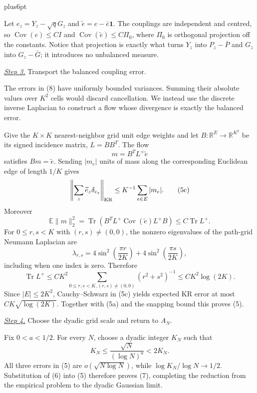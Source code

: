 \documentclass[11pt,reqno]{amsart}
\makeatletter
\theoremstyle{plain}
\theoremstyle{definition}
\theoremstyle{remark}
\renewenvironment{proof}[1][\proofname]{%
  \par
  \pushQED{\qed}%
  \normalfont
  \topsep6pt plus6pt\relax
  \trivlist
  \item[\hskip\labelsep\slshape #1\@addpunct{.}]%
  \ignorespaces
}{%
  \popQED
  \endtrivlist
  \@endpefalse
}
\DeclareRobustCommand{\qed}{%
  \leavevmode\unskip\penalty9999\hbox{}\nobreak
  \ifmmode
    \makebox[0pt][l]{\qquad\hbox{\qedsymbol}}%
  \else
    \qquad\hbox{\qedsymbol}%
  \fi
}
\renewcommand{\qedsymbol}{\rule[.47pt]{4pt}{6pt}}
\numberwithin{equation}{section}
\newcommand{\1}{\mathbf 1}
\makeatother
\begin{document}
\begin{proof}
Let $e_ z=Y_ z-\sqrt qG_ z$ and
$\widetilde e=e-\bar e\mathbf1$.  The couplings are independent and
centred, so
$\operatorname {Cov}(e)\leq CI$ and
$\operatorname {Cov}(\widetilde e)\leq C\Pi_ 0$, where $\Pi_ 0$ is
orthogonal projection off the constants.  Notice that projection is
exactly what turns $Y_ z$ into $P_ z-\bar P$ and $G_ z$ into
$G_ z-\bar G$; it introduces no unbalanced measure.

\smallskip\noindent
\underline{\textit{Step 3.}} Transport the balanced coupling error.

The errors in (8) have uniformly bounded variances.  Summing their
absolute values over $K^2$ cells would discard cancellation.  We instead
use the discrete inverse Laplacian to construct a flow whose divergence
is exactly the balanced error.

Give the $K\times K$ nearest-neighbor grid unit edge weights and let
$B:\mathbb R^E\to\mathbb R^{K^2}$ be its signed incidence matrix,
$L=BB^T$.  The flow
\begin{equation*}
m=B^TL^+\widetilde e
\end{equation*}
satisfies $Bm=\widetilde e$.  Sending $|m_ e|$ units of mass along
the corresponding Euclidean edge of length $1/K$ gives
\begin{equation}
\left\|\sum_ z\widetilde e_ z\delta_ {c_ z}\right\|_ {\rm KR}
\leq K^{-1}\sum_ {e\in E}|m_ e|.
\tag{5c}
\end{equation}
Moreover
\begin{equation*}
\mathbb E\|m\|_ 2^2
=\operatorname {Tr}\!\left(B^TL^+\operatorname {Cov}(\widetilde e)
L^+B\right)
\leq C\operatorname {Tr}L^+.
\end{equation*}
For $0\leq r,s<K$ with $(r,s)\ne(0,0)$, the nonzero eigenvalues of the
path-grid Neumann Laplacian are
\begin{equation*}
\lambda_{r,s}=4\sin^2\!\left(\frac{\pi r}{2K}\right)+4\sin^2\!\left(\frac{\pi s}{2K}\right),
\end{equation*}
including when one index is zero.  Therefore
\begin{equation}
\operatorname {Tr}L^+
\leq CK^2\sum_ {0\leq r,s<K,(r,s)\ne(0,0)}(r^2+s^2)^{-1}
\leq CK^2\log(2K).
\tag{5d}
\end{equation}
Since $|E|\leq2K^2$, Cauchy--Schwarz in (5c) yields expected KR error
at most $CK\sqrt{\log(2K)}$.  Together with (5a) and the snapping
bound this proves (5).

\smallskip\noindent
\underline{\textit{Step 4.}} Choose the dyadic grid scale and return to $A_N$.

Fix $0<a<1/2$. For every $N$, choose a dyadic integer $K_ N$ such
that
\begin{equation*}
K_ N\leq\frac{\sqrt N}{(\log N)^a}<2K_ N.
\end{equation*}
All three errors in (5) are $o(\sqrt{N\log N})$, while
$\log K_ N/\log N\to1/2$.  Substitution of (6) into (5) therefore
proves (7), completing the reduction from the empirical problem to the
dyadic Gaussian limit.

\end{proof}
\end{document}
